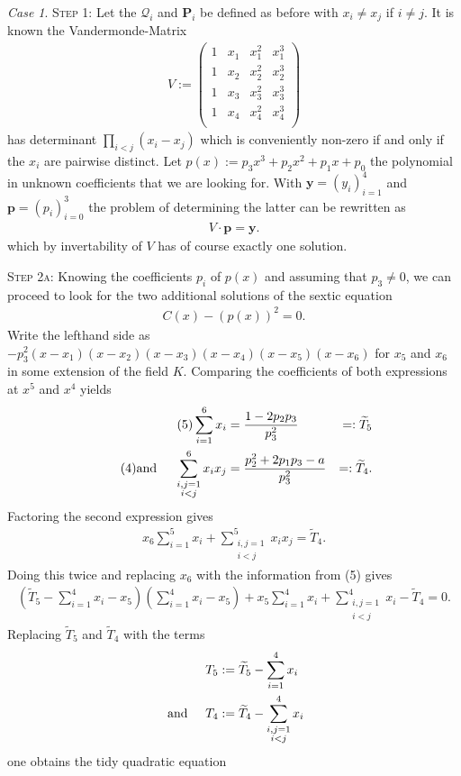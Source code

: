 \documentclass[english,11pt,a4paper]{article}
\theoremstyle{definition}
\theoremstyle{remark}
\theoremstyle{case}
\newtheorem{case}{Case}
\renewcommand{\P}{\mathbf{P}}
\newcommand{\q}{\mathcal{Q}}
\newcommand{\Tfi}{\widetilde T_5}
\newcommand{\Tfo}{\widetilde T_4}
\newcommand{\sumfo}{\sum_{i=1}^4 x_i}
\newcommand{\sumsumfo}{\sum_{\substack{i,j=1\\i<j}}^4 x_i}
\begin{document}
\begin{case}
	{\scshape Step 1:} Let the $\q_i$ and $\P_i$ be defined as before with $x_i \neq x_j$ if $i \neq j$. It is known the Vandermonde-Matrix
	\begin{align*}V:=
		\begin{pmatrix}
			1 & x_1 & x_1^2 & x_1^3\\
			1 & x_2 & x_2^2 & x_2^3\\
			1 & x_3 & x_3^2 & x_3^3\\
			1 & x_4 & x_4^2 & x_4^3\\
		\end{pmatrix}
	\end{align*}
	has determinant $\prod_{i < j} (x_i-x_j)$ which is conveniently non-zero if and only if the $x_i$ are pairwise distinct. Let $p(x) := p_3 x^3 + p_2 x^2 + p_1 x + p_0$ the polynomial in unknown coefficients that we are looking for. With $\textbf{y} = (y_i)_{i=1}^4$ and $\textbf{p} = (p_i)_{i=0}^3$ the problem of determining the latter can be rewritten as
	\begin{align*}
		V \cdot \mathbf{p} = \mathbf{y}.
	\end{align*}
	which by invertability of $V$ has of course exactly one solution.

	{\scshape Step 2a:} Knowing the coefficients $p_i$ of $p(x)$ and assuming that $p_3 \neq 0$, we can proceed to look for the two additional solutions of the sextic equation
	\begin{align*}
		\tag{$\star$} \label{sex} C(x)-\left(p(x)\right)^2 = 0.
	\end{align*}
	Write the lefthand side as $-p_3^2(x-x_1)(x-x_2)(x-x_3)(x-x_4)(x-x_5)(x-x_6)$ for $x_5$ and $x_6$ in some extension of the field $K$. Comparing the coefficients of both expressions at $x^5$ and $x^4$ yields
	\begin{align*}
		\tag{5} \sum_{i=1}^6 x_i &= \frac{1-2 p_2 p_3}{p_3^2} &=: \Tfi \\
		\tag{4} \text{and\hspace{5mm}} \sum_{\substack{i,j=1\\i<j}}^6 x_i x_j &= \frac{p_2^2+2 p_1 p_3-a}{p_3^2} &=: \Tfo.
	\end{align*}
	Factoring the second expression gives
	\begin{align*}
		x_6 \sum_{i=1}^5 x_i + \sum_{\substack{i,j=1\\i<j}}^5 x_i x_j = \Tfo.
	\end{align*}
	Doing this twice and replacing $x_6$ with the information from (5) gives
	\begin{align*}
		\left(\Tfi - \sumfo - x_5\right) \left(\sumfo - x_5\right) + x_5\sumfo + \sumsumfo - \Tfo = 0.
	\end{align*}
	Replacing $\Tfi$ and $\Tfo$ with the terms
	\begin{align*}T_5 &:= \Tfi - \sumfo \\
	\text{ and\hspace{5mm}} T_4 &:= \Tfo - \sumsumfo\end{align*}
	one obtains the tidy quadratic equation


\end{case}
\end{document}

